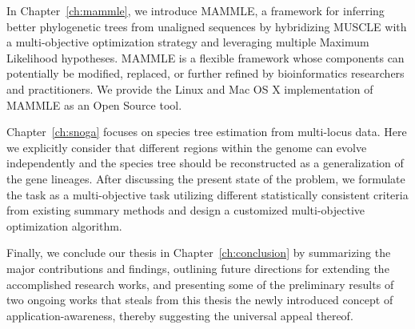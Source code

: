 In Chapter~\ref{ch:mammle}, we introduce MAMMLE, a framework for inferring better phylogenetic trees from unaligned sequences by hybridizing MUSCLE with a multi-objective optimization strategy and leveraging multiple Maximum Likelihood hypotheses. MAMMLE is a flexible framework whose components can potentially be modified, replaced, or further refined by bioinformatics researchers and practitioners. We provide the Linux and Mac OS X implementation of MAMMLE as an Open Source tool.


Chapter~\ref{ch:snoga} focuses on species tree estimation from multi-locus data. Here we explicitly consider that different regions within the genome can evolve independently and the species tree should be reconstructed as a generalization of the gene lineages. After discussing the present state of the problem, we formulate the task as a multi-objective task utilizing different statistically consistent criteria from existing summary methods and design a customized multi-objective optimization algorithm.


Finally, we conclude our thesis in Chapter~\ref{ch:conclusion} by summarizing the major contributions and findings, outlining future directions for extending the accomplished research works, and presenting some of the preliminary results of two ongoing works that steals from this thesis the newly introduced concept of application-awareness, thereby suggesting the universal appeal thereof.

